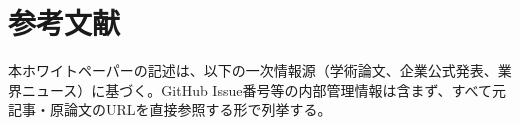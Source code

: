 \section{参考文献}
\label{sec:references}

本ホワイトペーパーの記述は、以下の一次情報源（学術論文、企業公式発表、業界ニュース）に基づく。GitHub Issue番号等の内部管理情報は含まず、すべて元記事・原論文のURLを直接参照する形で列挙する。

\nocite{*}
\printbibliography[heading=none]

